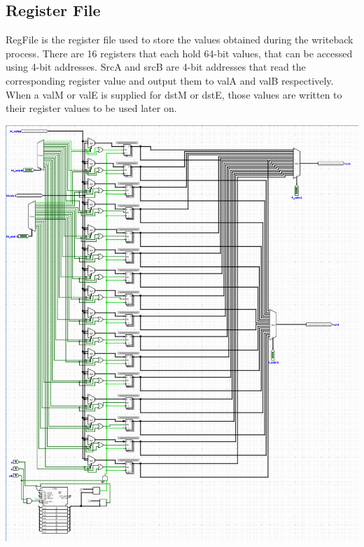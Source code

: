 \documentclass{article}
\begin{document}
\subsection{Register File}
RegFile is the register file used to store the values obtained during the writeback process. There are 16 registers that each hold 64-bit values, that can be accessed using 4-bit addresses. SrcA and srcB are 4-bit addresses that read the corresponding register value and output them to valA and valB respectively. When a valM or valE is supplied for dstM or dstE, those values are written to their register values to be used later on. 
\begin{center}
    \includegraphics[scale=.6]{regFile.png}
\end{center}
\end{document}
